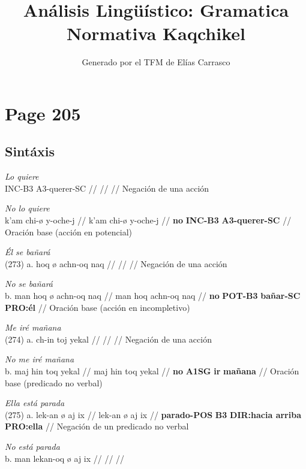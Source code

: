 \documentclass{article}%
\title{Análisis Lingüístico: Gramatica Normativa Kaqchikel}%
\author{Generado por el TFM de Elías Carrasco}%
\begin{document}
%
\normalsize%
\maketitle%
\section{Page 205}%
\label{sec:Page205}%
\subsection{Sintáxis}%
\label{subsec:Sintxis}%

%
\par\medskip%
\ex
\textit{Lo quiere} \\
\begingl
\gla INC-B3 A3-querer-SC //
\glb  //
\glc  //
\endgl
\xe
%
\medskip%
Negación de una acción %
\par\medskip%
\ex
\textit{No lo quiere} \\
\begingl
\gla k’am chi-ø y-oche-j //
\glb k’am chi-ø y-oche-j //
\glc \textbf{no} \textbf{INC-B3} \textbf{A3-querer-SC} //
\endgl
\xe
%
\medskip%
Oración base (acción en potencial) %
\par\medskip%
\ex
\textit{Él se bañará} \\
\begingl
\gla (273) a. hoq ø achn-oq naq //
\glb  //
\glc  //
\endgl
\xe
%
\medskip%
Negación de una acción %
\par\medskip%
\ex
\textit{No se bañará} \\
\begingl
\gla b. man hoq ø achn-oq naq //
\glb man hoq achn-oq naq //
\glc \textbf{no} \textbf{POT-B3} \textbf{bañar-SC} \textbf{PRO:él} //
\endgl
\xe
%
\medskip%
Oración base (acción en incompletivo) %
\par\medskip%
\ex
\textit{Me iré mañana} \\
\begingl
\gla (274) a. ch-in toj yekal //
\glb  //
\glc  //
\endgl
\xe
%
\medskip%
Negación de una acción %
\par\medskip%
\ex
\textit{No me iré mañana} \\
\begingl
\gla b. maj hin toq yekal //
\glb maj hin toq yekal //
\glc \textbf{no} \textbf{A1SG} \textbf{ir} \textbf{mañana} //
\endgl
\xe
%
\medskip%
Oración base (predicado no verbal) %
\par\medskip%
\ex
\textit{Ella está parada} \\
\begingl
\gla (275) a. lek-an ø aj ix //
\glb lek-an ø aj ix //
\glc \textbf{parado-POS} \textbf{B3} \textbf{DIR:hacia arriba} \textbf{PRO:ella} //
\endgl
\xe
%
\medskip%
Negación de un predicado no verbal %
\par\medskip%
\ex
\textit{No está parada} \\
\begingl
\gla b. man lekan-oq ø aj ix //
\glb  //
\glc  //
\endgl
\xe
%
\medskip

%
\end{document}
